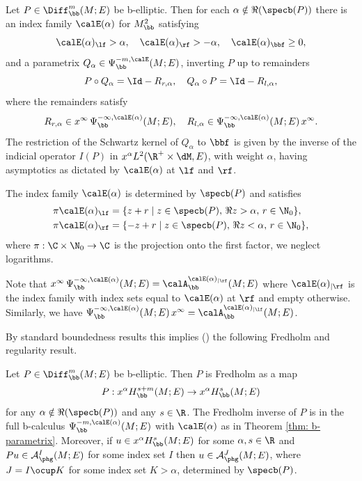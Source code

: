 \begin{Th} \label{thm: b-parametrix}
Let $P \in \Diff^m_\bb(M; E)$ be b-elliptic. Then for each $\alpha \notin \Re (\specb(P))$
there is an index family $\calE(\alpha)$ for $M^2_\bb$ satisfying
\[
\calE(\alpha)_{\lf} > \alpha,\quad \calE(\alpha)_{\rf} > -\alpha,\quad \calE(\alpha)_{\bbf} \geq 0,
\]
and a parametrix
$Q_{\alpha} \in \Psi_\bb^{-m, \calE}(M; E)$,
inverting $P$ up to remainders
\[
P \circ Q_{\alpha} = \Id - R_{r,\alpha},\quad Q_{\alpha} \circ P= \Id - R_{l,\alpha},
\]
where the remainders satisfy
\[
R_{r,\alpha} \in x^\infty\,\Psi_\bb^{-\infty,\calE(\alpha)} (M;E)
,\quad
R_{l,\alpha} \in \Psi_\bb^{-\infty,\calE(\alpha)}(M;E)\,x^\infty.
\]
The restriction of the Schwartz kernel of $Q_{\alpha}$ to $\bbf$ is given by the inverse of the
indicial operator $I(P)$ in $x^\alpha L^2(\R^+ \times \dM, E)$, with weight $\alpha$, \ie having asymptotics as dictated by $\calE(\alpha)$ at $\lf$ and $\rf$.

The index family $\calE(\alpha)$ is determined by $\specb(P)$
and satisfies
\begin{equation}
\label{eqn:index sets}
\begin{split}
\pi\calE(\alpha)_\lf &= \{z+r \mid z\in \specb(P),\,\Re z >\alpha,\,r\in\N_0\},\\
\pi\calE(\alpha)_\rf &= \{-z+r \mid z\in \specb(P),\,\Re z <\alpha,\,r\in\N_0\},
\end{split}
\end{equation}
where $\pi:\C\times\N_0\to\C$ is the projection onto the first factor, \ie we neglect logarithms.
\end{Th}

Note that $x^\infty\,\Psi_\bb^{-\infty,\calE(\alpha)}(M;E) = \calA_\bb^{\calE(\alpha)_{|\rf}}(M;E)$ where $\calE(\alpha)_{|\rf}$ is the index family with index sets equal to $\calE(\alpha)$ at $\rf$ and empty otherwise. Similarly, we have $\Psi_\bb^{-\infty,\calE(\alpha)} (M;E)\,x^\infty = \calA_\bb^{\calE(\alpha)_{|\lf}}(M;E)$.

By standard boundedness results this implies (\cf \cite[Th.\,5.60 and Prop. 5.61]{melrose1993atiyah})
the following Fredholm and regularity result.

\skpt
\begin{Th}
\label{thm:b Fredholm regularity}
Let $P\in \Diff^m_\bb(M; E)$ be b-elliptic. Then $P$ is Fredholm as a map
\[
P:x^\alpha H^{s+m}_\bb(M; E) \to x^{\alpha}H^{s}_\bb(M; E)
\]
for any $\alpha \notin \Re (\specb (P))$ and any $s\in\R$. The Fredholm inverse of $P$ is in
the full b\nobreakdash-calculus $\Psi_\bb^{-m, \calE(\alpha)}(M; E)$ with $\calE(\alpha)$ as in Theorem
\ref{thm: b-parametrix}. Moreover, if $u \in x^\alpha H^s_\bb(M; E)$ for some $\alpha,s\in\R$ and
$Pu \in \mathcal{A}^I_{\phg}(M; E)$ for some index set $I$ then $u\in \mathcal{A}^J_{\phg}(M; E)$,
where $J = I \ocup K$ for some index set $K>\alpha$, determined by $\specb(P)$.
\end{Th}

